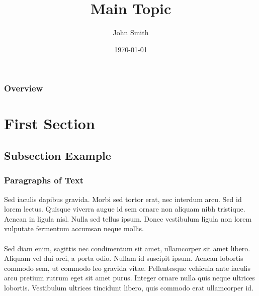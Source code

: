 \documentclass{beamer}
\title[Short title]{Main Topic } %
\author{John Smith} %
\institute[UCLA] %
{
University of California \\ %
\medskip
\textit{john@smith.com} %
}
\date{\today} %
\begin{document}
\begin{frame}
\titlepage %
\end{frame}

\begin{frame}
\frametitle{Overview} %
\tableofcontents %
\end{frame}


\section{First Section} %

\subsection{Subsection Example} %

\begin{frame}
\frametitle{Paragraphs of Text}
Sed iaculis dapibus gravida. Morbi sed tortor erat, nec interdum arcu. Sed id lorem lectus. Quisque viverra augue id sem ornare non aliquam nibh tristique. Aenean in ligula nisl. Nulla sed tellus ipsum. Donec vestibulum ligula non lorem vulputate fermentum accumsan neque mollis.\\~\\

Sed diam enim, sagittis nec condimentum sit amet, ullamcorper sit amet libero. Aliquam vel dui orci, a porta odio. Nullam id suscipit ipsum. Aenean lobortis commodo sem, ut commodo leo gravida vitae. Pellentesque vehicula ante iaculis arcu pretium rutrum eget sit amet purus. Integer ornare nulla quis neque ultrices lobortis. Vestibulum ultrices tincidunt libero, quis commodo erat ullamcorper id.
\end{frame}
\end{document}
